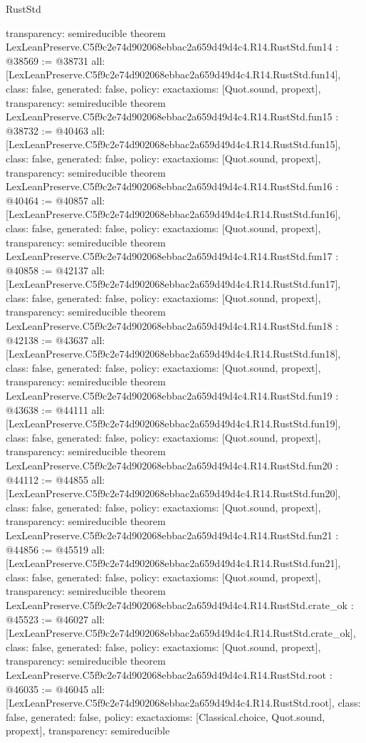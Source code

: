 \begin{lexlean}{RustStd}
\begin{coremodule}
{  transparency: semireducible
}
theorem LexLeanPreserve.C5f9c2e74d902068ebbac2a659d49d4c4.R14.RustStd.fun14 : @38569 := @38731 {
  all: [LexLeanPreserve.C5f9c2e74d902068ebbac2a659d49d4c4.R14.RustStd.fun14],
  class: false,
  generated: false,
  policy: exact{axioms: [Quot.sound, propext]},
  transparency: semireducible
}
theorem LexLeanPreserve.C5f9c2e74d902068ebbac2a659d49d4c4.R14.RustStd.fun15 : @38732 := @40463 {
  all: [LexLeanPreserve.C5f9c2e74d902068ebbac2a659d49d4c4.R14.RustStd.fun15],
  class: false,
  generated: false,
  policy: exact{axioms: [Quot.sound, propext]},
  transparency: semireducible
}
theorem LexLeanPreserve.C5f9c2e74d902068ebbac2a659d49d4c4.R14.RustStd.fun16 : @40464 := @40857 {
  all: [LexLeanPreserve.C5f9c2e74d902068ebbac2a659d49d4c4.R14.RustStd.fun16],
  class: false,
  generated: false,
  policy: exact{axioms: [Quot.sound, propext]},
  transparency: semireducible
}
theorem LexLeanPreserve.C5f9c2e74d902068ebbac2a659d49d4c4.R14.RustStd.fun17 : @40858 := @42137 {
  all: [LexLeanPreserve.C5f9c2e74d902068ebbac2a659d49d4c4.R14.RustStd.fun17],
  class: false,
  generated: false,
  policy: exact{axioms: [Quot.sound, propext]},
  transparency: semireducible
}
theorem LexLeanPreserve.C5f9c2e74d902068ebbac2a659d49d4c4.R14.RustStd.fun18 : @42138 := @43637 {
  all: [LexLeanPreserve.C5f9c2e74d902068ebbac2a659d49d4c4.R14.RustStd.fun18],
  class: false,
  generated: false,
  policy: exact{axioms: [Quot.sound, propext]},
  transparency: semireducible
}
theorem LexLeanPreserve.C5f9c2e74d902068ebbac2a659d49d4c4.R14.RustStd.fun19 : @43638 := @44111 {
  all: [LexLeanPreserve.C5f9c2e74d902068ebbac2a659d49d4c4.R14.RustStd.fun19],
  class: false,
  generated: false,
  policy: exact{axioms: [Quot.sound, propext]},
  transparency: semireducible
}
theorem LexLeanPreserve.C5f9c2e74d902068ebbac2a659d49d4c4.R14.RustStd.fun20 : @44112 := @44855 {
  all: [LexLeanPreserve.C5f9c2e74d902068ebbac2a659d49d4c4.R14.RustStd.fun20],
  class: false,
  generated: false,
  policy: exact{axioms: [Quot.sound, propext]},
  transparency: semireducible
}
theorem LexLeanPreserve.C5f9c2e74d902068ebbac2a659d49d4c4.R14.RustStd.fun21 : @44856 := @45519 {
  all: [LexLeanPreserve.C5f9c2e74d902068ebbac2a659d49d4c4.R14.RustStd.fun21],
  class: false,
  generated: false,
  policy: exact{axioms: [Quot.sound, propext]},
  transparency: semireducible
}
theorem LexLeanPreserve.C5f9c2e74d902068ebbac2a659d49d4c4.R14.RustStd.crate_ok : @45523 := @46027 {
  all: [LexLeanPreserve.C5f9c2e74d902068ebbac2a659d49d4c4.R14.RustStd.crate_ok],
  class: false,
  generated: false,
  policy: exact{axioms: [Quot.sound, propext]},
  transparency: semireducible
}
theorem LexLeanPreserve.C5f9c2e74d902068ebbac2a659d49d4c4.R14.RustStd.root : @46035 := @46045 {
  all: [LexLeanPreserve.C5f9c2e74d902068ebbac2a659d49d4c4.R14.RustStd.root],
  class: false,
  generated: false,
  policy: exact{axioms: [Classical.choice, Quot.sound, propext]},
  transparency: semireducible
}


\end{coremodule}
\end{lexlean}
